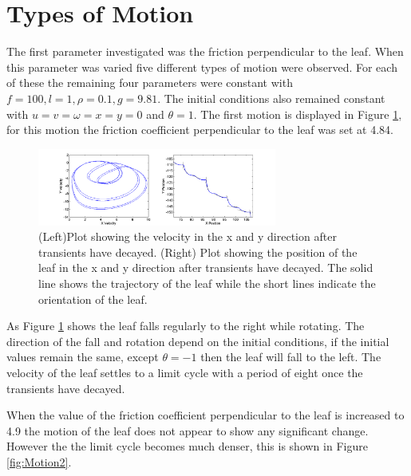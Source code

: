 \section{Types of Motion}
\label{sec:motion}

\noindent The first parameter investigated was the friction perpendicular to the leaf. When this parameter was varied five different types of motion were observed. For each of these the remaining four parameters were constant with $f=100, l=1, \rho = 0.1, g = 9.81$. The initial conditions also remained constant with $u=v=\omega=x=y=0$ and $\theta=1$.
\noindent The first motion is displayed in Figure \ref{fig:Motion1}, for this motion the friction coefficient perpendicular to the leaf was set at 4.84. 

\begin{figure}[H]
\centering
\includegraphics[width=0.7\textwidth]{Motion_Graphs/Motion1.png}
\caption{\label{fig:Motion1}(Left)Plot showing the velocity in the x and y direction after transients have decayed. (Right) Plot showing the position of the leaf in the x and y direction after transients have decayed. The solid line shows the trajectory of the leaf while the short lines indicate the orientation of the leaf.%
}
\end{figure}

\noindent As Figure \ref{fig:Motion1} shows the leaf falls regularly to the right while rotating. The direction of the fall and rotation depend on the initial conditions, if the initial values remain the same, except $\theta=-1$ then the leaf will fall to the left. The velocity of the leaf settles to a limit cycle with a period of eight once the transients have decayed. 

\noindent When the value of the friction coefficient perpendicular to the leaf is increased to 4.9 the motion of the leaf does not appear to show any significant change. However the the limit cycle becomes much denser, this is shown in Figure \ref{fig:Motion2}. %

